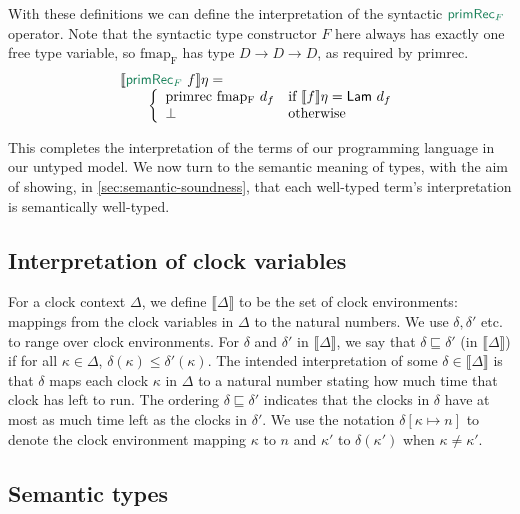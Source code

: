 \documentclass[natbib]{sigplanconf}
\newcommand{\elim}[1]{\textcolor{elim}{\textsf{#1}}}
\newcommand{\sem}[1]{\llbracket #1 \rrbracket}
\newcommand{\clkSem}[1]{\llbracket #1 \rrbracket}
\newcommand{\semCons}[1]{\mathsf{#1}}
\begin{document}
With these definitions we can define the interpretation of the
syntactic $\elim{primRec$_F$}$ operator. Note that the syntactic type
constructor $F$ here always has exactly one free type variable, so
$\mathrm{fmap_F}$ has type $D \to D \to D$, as required by
$\mathrm{primrec}$.
\begin{displaymath}
  \begin{array}{l}
    \sem{\elim{primRec$_F$}\ f}\eta = \\
    \quad\quad\left\{
      \begin{array}{ll}
        \mathrm{primrec}\ \mathrm{fmap_F}\ d_f & \textrm{if }\sem{f}\eta = \semCons{Lam}\ d_f \\
        \bot & \textrm{otherwise}
      \end{array}
    \right.
  \end{array}
\end{displaymath}

This completes the interpretation of the terms of our programming
language in our untyped model. We now turn to the semantic meaning of
types, with the aim of showing, in \autoref{sec:semantic-soundness},
that each well-typed term's interpretation is semantically well-typed.

\subsection{Interpretation of clock variables}
\label{sec:clock-envs}

For a clock context $\Delta$, we define $\clkSem{\Delta}$ to be the
set of clock environments: mappings from the clock variables in
$\Delta$ to the natural numbers. We use $\delta, \delta'$ etc. to
range over clock environments. For $\delta$ and $\delta'$ in
$\clkSem{\Delta}$, we say that $\delta \sqsubseteq \delta'$ (in
$\clkSem\Delta$) if for all $\kappa \in \Delta$, $\delta(\kappa) \leq
\delta'(\kappa)$. The intended interpretation of some $\delta \in
\clkSem\Delta$ is that $\delta$ maps each clock $\kappa$ in $\Delta$
to a natural number stating how much time that clock has left to
run. The ordering $\delta \sqsubseteq \delta'$ indicates that the
clocks in $\delta$ have at most as much time left as the clocks in
$\delta'$. We use the notation $\delta[\kappa \mapsto n]$ to denote
the clock environment mapping $\kappa$ to $n$ and $\kappa'$ to
$\delta(\kappa')$ when $\kappa \not= \kappa'$.

\subsection{Semantic types}
\label{sec:semantic-types}
\end{document}
